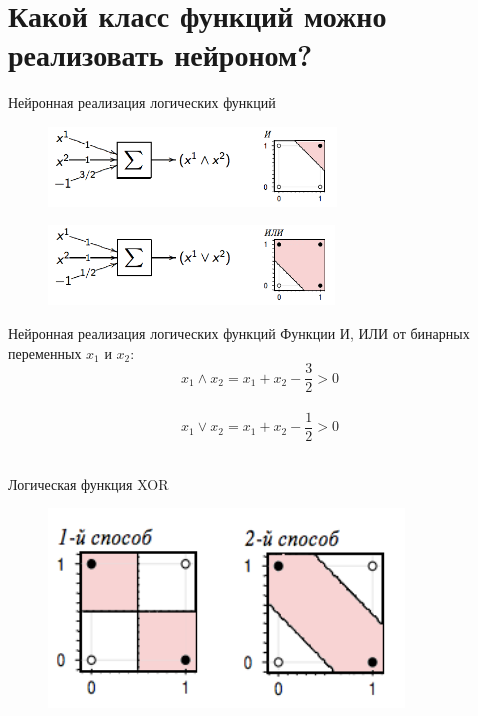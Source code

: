 \documentclass[10pt]{beamer}
\begin{document}
\section{Какой класс функций можно реализовать нейроном?}

\begin{frame}{Нейронная реализация логических функций}
	\begin{figure}[htbp]
	  \includegraphics[height=60pt, keepaspectratio = true]{images/OR}   
	\end{figure}
	
	\begin{figure}[htbp]
	  \includegraphics[height=60pt, keepaspectratio = true]{images/AND}   
	\end{figure}
\end{frame}

\begin{frame}{Нейронная реализация логических функций}
	Функции И, ИЛИ от бинарных переменных $x_1$ и $x_2$:\\
	$$x_1 \wedge x_2 = x_1 + x_2 - \frac{3}{2} > 0$$\\
	$$x_1 \vee x_2 = x_1 + x_2 - \frac{1}{2} > 0$$\\
\end{frame}

\begin{frame}{Логическая функция XOR}
	\begin{figure}[htbp]
	  \includegraphics[height=150pt, keepaspectratio = true]{images/XOR}   
	\end{figure}
\end{frame}
\end{document}
